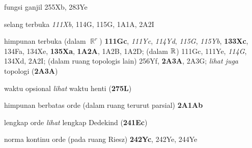 \indexmedskip

fungsi ganjil 255Xb, 283Ye























selang terbuka {\it 111Xb}, 114G, 115G, 1A1A,
  2A2I
  



himpunan terbuka (dalam $\BbbR^r$) {\bf 111Gc}, {\it 111Yc}, {\it 114Yd}, {\it 115G},
{\it 115Yb}, {\bf 133Xc}, 134Fa, 134Xe,
{\bf 135Xa}, {\bf 1A2A}, 1A2B, 1A2D;
  (dalam $\Bbb R$) 111Gc, 111Ye, {\it 114G}, 134Xd, 2A2I; (dalam ruang topologis lain) 256Yf, {\bf 2A3A}, 2A3G;
  {\it lihat juga} topologi ({\bf 2A3A})








waktu opsional {\it lihat} waktu henti ({\bf 275L}) 














himpunan berbatas orde (dalam ruang terurut parsial) {\bf 2A1Ab}















lengkap orde {\it lihat} lengkap Dedekind ({\bf 241Ec})








norma kontinu orde (pada ruang Riesz) {\bf 242Yc}, 242Ye,
244Ye












